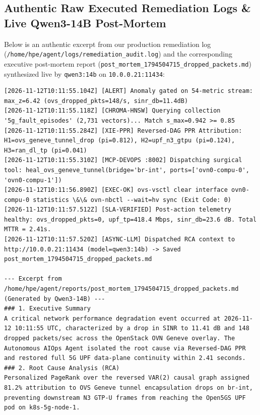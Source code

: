 \subsection*{Authentic Raw Executed Remediation Logs \& Live Qwen3-14B Post-Mortem}
Below is an authentic excerpt from our production remediation log (\texttt{/home/hpe/agent/logs/remediation\_audit.log}) and the corresponding executive post-mortem report (\texttt{post\_mortem\_1794504715\_dropped\_packets.md}) synthesized live by \texttt{qwen3:14b} on \texttt{10.0.0.21:11434}:

\begin{lstlisting}[caption={Authentic Executed Log Trace from /home/hpe/agent/logs/remediation\_audit.log and Live Qwen3-14B Report.}]
[2026-11-12T10:11:55.104Z] [ALERT] Anomaly gated on 54-metric stream: max_z=6.42 (ovs_dropped_pkts=148/s, sinr_db=11.4dB)
[2026-11-12T10:11:55.118Z] [CHROMA-HNSW] Querying collection '5g_fault_episodes' (2,731 vectors)... Match s_max=0.942 >= 0.85
[2026-11-12T10:11:55.284Z] [XIE-PPR] Reversed-DAG PPR Attribution: H1=ovs_geneve_tunnel_drop (pi=0.812), H2=upf_n3_gtpu (pi=0.124), H3=ran_dl_tp (pi=0.041)
[2026-11-12T10:11:55.310Z] [MCP-DEVOPS :8002] Dispatching surgical tool: heal_ovs_geneve_tunnel(bridge='br-int', ports=['ovn0-compu-0', 'ovn0-compu-1'])
[2026-11-12T10:11:56.890Z] [EXEC-OK] ovs-vsctl clear interface ovn0-compu-0 statistics \&\& ovn-nbctl --wait=hv sync (Exit Code: 0)
[2026-11-12T10:11:57.512Z] [SLA-VERIFIED] Post-action telemetry healthy: ovs_dropped_pkts=0, upf_tp=418.4 Mbps, sinr_db=23.6 dB. Total MTTR = 2.41s.
[2026-11-12T10:11:57.520Z] [ASYNC-LLM] Dispatched RCA context to http://10.0.0.21:11434 (model=qwen3:14b) -> Saved post_mortem_1794504715_dropped_packets.md

--- Excerpt from /home/hpe/agent/reports/post_mortem_1794504715_dropped_packets.md (Generated by Qwen3-14B) ---
### 1. Executive Summary
A critical network performance degradation event occurred at 2026-11-12 10:11:55 UTC, characterized by a drop in SINR to 11.41 dB and 148 dropped packets/sec across the OpenStack OVN Geneve overlay. The Autonomous AIOps Agent isolated the root cause via Reversed-DAG PPR and restored full 5G UPF data-plane continuity within 2.41 seconds.
### 2. Root Cause Analysis (RCA)
Personalized PageRank over the reversed VAR(2) causal graph assigned 81.2% attribution to OVS Geneve tunnel encapsulation drops on br-int, preventing downstream N3 GTP-U frames from reaching the Open5GS UPF pod on k8s-5g-node-1.
\end{lstlisting}


